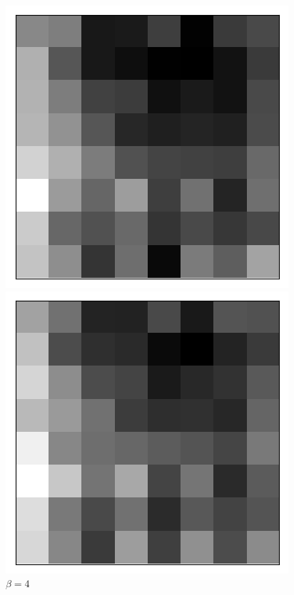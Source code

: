 \begin{figure}[h!]
\centering
\captionsetup{justification=centering}
\begin{multicols}{3}
    \includegraphics[scale=0.4]{figures/results/latent_image/beta_1_average_activation.png}
    \caption{$\beta=1$}
    \includegraphics[scale=0.4]{figures/results/latent_image/beta_4_average_activation.png}
    \caption{$\beta=4$}

\end{multicols}
\end{figure}
